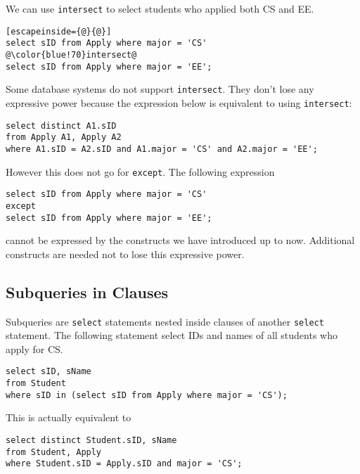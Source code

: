 We can use \texttt{intersect} to select students who applied both CS and EE.
\begin{lstlisting}[escapeinside={@}{@}]
select sID from Apply where major = 'CS'
@\color{blue!70}intersect@
select sID from Apply where major = 'EE';
\end{lstlisting}
Some database systems do not support \texttt{intersect}. They don't lose any expressive power because the expression below is equivalent to using \texttt{intersect}:
\begin{lstlisting}
select distinct A1.sID
from Apply A1, Apply A2
where A1.sID = A2.sID and A1.major = 'CS' and A2.major = 'EE';
\end{lstlisting}

However this does not go for \texttt{except}. The following expression
\begin{lstlisting}
select sID from Apply where major = 'CS'
except
select sID from Apply where major = 'EE';
\end{lstlisting}
cannot be expressed by the constructs we have introduced up to now. Additional constructs are needed not to lose this expressive power.
\subsection{Subqueries in Clauses}
Subqueries are \texttt{select} statements nested inside clauses of another \texttt{select} statement. The following statement select IDs and names of all students who apply for CS.
\begin{lstlisting}
select sID, sName
from Student
where sID in (select sID from Apply where major = 'CS');
\end{lstlisting}
This is actually equivalent to 
\begin{lstlisting}
select distinct Student.sID, sName
from Student, Apply
where Student.sID = Apply.sID and major = 'CS';
\end{lstlisting}
